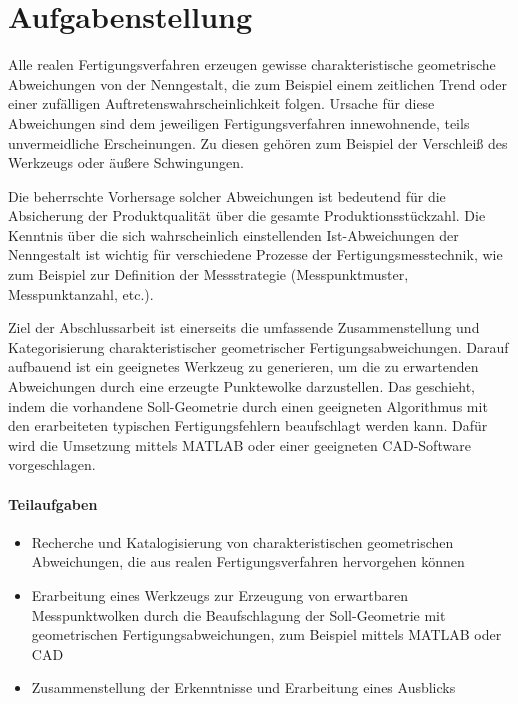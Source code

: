 \section*{Aufgabenstellung}

Alle realen Fertigungsverfahren erzeugen gewisse charakteristische geometrische Abweichungen von der Nenngestalt, die zum Beispiel einem zeitlichen Trend oder einer zufälligen Auftretenswahrscheinlichkeit folgen. Ursache für diese Abweichungen sind dem jeweiligen Fertigungsverfahren innewohnende, teils unvermeidliche Erscheinungen. Zu diesen gehören zum Beispiel der Verschleiß des Werkzeugs oder äußere Schwingungen. 

Die beherrschte Vorhersage solcher Abweichungen ist bedeutend für die Absicherung der Produktqualität über die gesamte Produktionsstückzahl. Die Kenntnis über die sich wahrscheinlich einstellenden Ist-Abweichungen der Nenngestalt ist wichtig für verschiedene Prozesse der Fertigungsmesstechnik, wie zum Beispiel zur Definition der Messstrategie (Messpunktmuster, Messpunktanzahl, etc.). 

Ziel der Abschlussarbeit ist einerseits die umfassende Zusammenstellung und Kategorisierung charakteristischer geometrischer Fertigungsabweichungen. Darauf aufbauend ist ein geeignetes Werkzeug zu generieren, um die zu erwartenden Abweichungen durch eine erzeugte Punktewolke darzustellen.
Das geschieht, indem die vorhandene Soll-Geometrie durch einen geeigneten Algorithmus mit den erarbeiteten typischen Fertigungsfehlern beaufschlagt werden kann. Dafür wird die Umsetzung mittels MATLAB oder einer geeigneten CAD-Software vorgeschlagen. 

\paragraph{Teilaufgaben}

\begin{itemize}
	\item Recherche und Katalogisierung von charakteristischen geometrischen Abweichungen, die aus realen Fertigungsverfahren hervorgehen können
	\item Erarbeitung eines Werkzeugs zur Erzeugung von erwartbaren Messpunktwolken durch die Beaufschlagung der Soll-Geometrie mit geometrischen Fertigungsabweichungen, zum Beispiel mittels MATLAB oder CAD
	\item Zusammenstellung der Erkenntnisse und Erarbeitung eines Ausblicks  
\end{itemize}